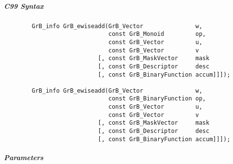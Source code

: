 \subparagraph{C99 Syntax}

\begin{verbatim}
        GrB_info GrB_ewiseadd(GrB_Vector               w,
                              const GrB_Monoid         op, 
                              const GrB_Vector         u,
                              const GrB_Vector         v
                           [, const GrB_MaskVector     mask
                           [, const GrB_Descriptor     desc
                           [, const GrB_BinaryFunction accum]]]);
                            
        GrB_info GrB_ewiseadd(GrB_Vector               w,
                              const GrB_BinaryFunction op, 
                              const GrB_Vector         u,
                              const GrB_Vector         v
                           [, const GrB_MaskVector     mask
                           [, const GrB_Descriptor     desc
                           [, const GrB_BinaryFunction accum]]]);
\end{verbatim}

\subparagraph{Parameters}

